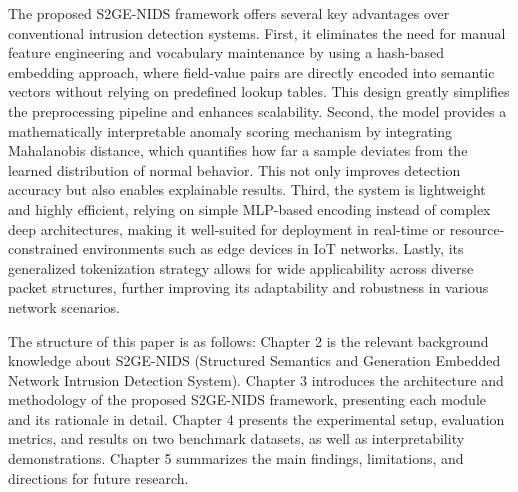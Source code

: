 \begin{ZhChapter}
    The proposed S2GE-NIDS framework offers several key advantages over conventional intrusion detection systems. First, it eliminates the need for manual feature engineering and vocabulary maintenance by using a hash-based embedding approach, where field-value pairs are directly encoded into semantic vectors without relying on predefined lookup tables. This design greatly simplifies the preprocessing pipeline and enhances scalability. Second, the model provides a mathematically interpretable anomaly scoring mechanism by integrating Mahalanobis distance, which quantifies how far a sample deviates from the learned distribution of normal behavior. This not only improves detection accuracy but also enables explainable results. Third, the system is lightweight and highly efficient, relying on simple MLP-based encoding instead of complex deep architectures, making it well-suited for deployment in real-time or resource-constrained environments such as edge devices in IoT networks. Lastly, its generalized tokenization strategy allows for wide applicability across diverse packet structures, further improving its adaptability and robustness in various network scenarios.

    The structure of this paper is as follows: Chapter 2 is the relevant background knowledge about S2GE-NIDS (Structured Semantics and Generation Embedded Network Intrusion Detection System). Chapter 3 introduces the architecture and methodology of the proposed S2GE-NIDS framework, presenting each module and its rationale in detail. Chapter 4 presents the experimental setup, evaluation metrics, and results on two benchmark datasets, as well as interpretability demonstrations. Chapter 5 summarizes the main findings, limitations, and directions for future research.



\end{ZhChapter}